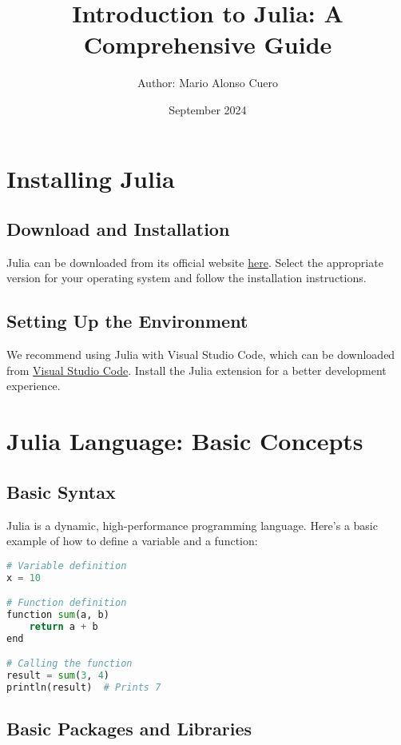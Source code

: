 \documentclass[a4paper,12pt]{article}
\title{Introduction to Julia: A Comprehensive Guide}
\author{Author: Mario Alonso Cuero}
\date{September 2024}
\begin{document}
\maketitle

\tableofcontents

\newpage

\section{Installing Julia}

\subsection{Download and Installation}
Julia can be downloaded from its official website \href{https://julialang.org/downloads/}{here}. Select the appropriate version for your operating system and follow the installation instructions.

\subsection{Setting Up the Environment}
We recommend using Julia with Visual Studio Code, which can be downloaded from \href{https://code.visualstudio.com/}{Visual Studio Code}. Install the Julia extension for a better development experience.

\section{Julia Language: Basic Concepts}

\subsection{Basic Syntax}
Julia is a dynamic, high-performance programming language. Here's a basic example of how to define a variable and a function:

\begin{lstlisting}[language=Python]
# Variable definition
x = 10

# Function definition
function sum(a, b)
    return a + b
end

# Calling the function
result = sum(3, 4)
println(result)  # Prints 7
\end{lstlisting}

\subsection{Basic Packages and Libraries}
\end{document}
